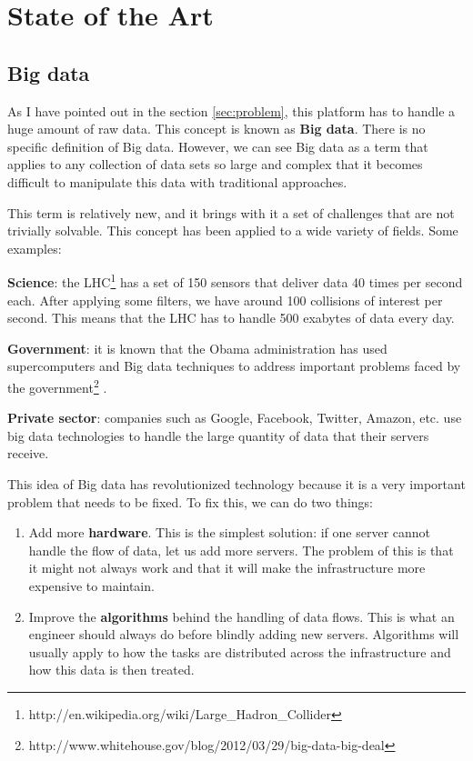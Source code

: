 
\section{State of the Art}
\label{sec:state}

\subsection{Big data}

As I have pointed out in the section \ref{sec:problem}, this platform has to
handle a huge amount of raw data. This concept is known as {\bf Big data}. There
is no specific definition of Big data. However, we can see Big data as a term
that applies to any collection of data sets so large and complex that it becomes
difficult to manipulate this data with traditional approaches.

This term is relatively new, and it brings with it a set of challenges that
are not trivially solvable. This concept has been applied to a wide variety of
fields. Some examples:

\mylist
  \item {\bf Science}: the
\ac{LHC}\footnote{http://en.wikipedia.org/wiki/Large\_Hadron\_Collider} has a
set of 150 sensors that deliver data 40 times per second each. After applying
some filters, we have around 100 collisions of interest per second. This means
that the \ac{LHC} has to handle 500 exabytes of data every day.
  \item {\bf Government}: it is known that the Obama administration has used
supercomputers and Big data techniques to address important problems faced by
the
government\footnote{http://www.whitehouse.gov/blog/2012/03/29/big-data-big-deal}
.
  \item {\bf Private sector}: companies such as Google, Facebook, Twitter,
Amazon, etc. use big data technologies to handle the large quantity of data
that their servers receive.
\mylistend

This idea of Big data has revolutionized technology because it is a very
important problem that needs to be fixed. To fix this, we can do two things:

\begin{enumerate}
  \itemsep0em
  \item Add more {\bf hardware}. This is the simplest solution: if one server
cannot handle the flow of data, let us add more servers. The problem of this is
that it might not always work and that it will make the infrastructure more
expensive to maintain.
  \item Improve the {\bf algorithms} behind the handling of data flows. This is
what an engineer should always do before blindly adding new servers. Algorithms
will usually apply to how the tasks are distributed across the infrastructure
and how this data is then treated.
\end{enumerate}

